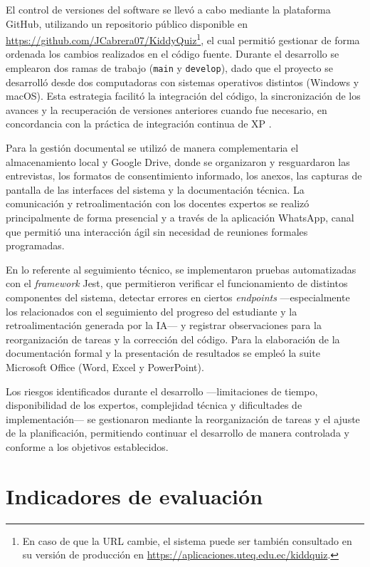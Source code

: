 El control de versiones del software se llevó a cabo mediante la plataforma GitHub, utilizando un repositorio público disponible en \url{https://github.com/JCabrera07/KiddyQuiz}\footnote{En caso de que la URL cambie, el sistema puede ser también consultado en su versión de producción en \url{https://aplicaciones.uteq.edu.ec/kiddquiz}.},
el cual permitió gestionar de forma ordenada los cambios realizados en el código fuente. Durante el desarrollo se emplearon dos ramas de trabajo (\texttt{main} y \texttt{develop}), dado que el proyecto se desarrolló desde dos computadoras con sistemas operativos distintos (Windows y macOS). Esta estrategia facilitó la integración del código, la sincronización de los avances y la recuperación de versiones anteriores cuando fue necesario, en concordancia con la práctica de integración continua de XP \cite{beck2004xp}.

Para la gestión documental se utilizó de manera complementaria el almacenamiento local y Google Drive, donde se organizaron y resguardaron las entrevistas, los formatos de consentimiento informado, los anexos, las capturas de pantalla de las interfaces del sistema y la documentación técnica. La comunicación y retroalimentación con los docentes expertos se realizó principalmente de forma presencial y a través de la aplicación WhatsApp, canal que permitió una interacción ágil sin necesidad de reuniones formales programadas.

En lo referente al seguimiento técnico, se implementaron pruebas automatizadas con el \textit{framework} Jest, que permitieron verificar el funcionamiento de distintos componentes del sistema, detectar errores en ciertos \textit{endpoints} ---especialmente los relacionados con el seguimiento del progreso del estudiante y la retroalimentación generada por la IA--- y registrar observaciones para la reorganización de tareas y la corrección del código. Para la elaboración de la documentación formal y la presentación de resultados se empleó la suite Microsoft Office (Word, Excel y PowerPoint).

Los riesgos identificados durante el desarrollo ---limitaciones de tiempo, disponibilidad de los expertos, complejidad técnica y dificultades de implementación--- se gestionaron mediante la reorganización de tareas y el ajuste de la planificación, permitiendo continuar el desarrollo de manera controlada y conforme a los objetivos establecidos.

\section{Indicadores de evaluación}
\label{sec:indicadores}

